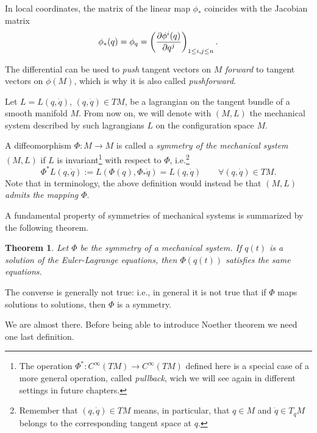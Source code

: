 \documentclass[english,fontsize=11pt,paper=a5,oneside]{scrbook}
\let\d\relax
\newcommand{\d}{\mathrm{d}}
\newtheorem{theorem}{Theorem}[chapter]
\theoremstyle{definition}
\begin{document}
In local coordinates, the matrix of the linear map $\phi_*$ coincides with the Jacobian matrix
\begin{equation}
  \phi_*(q) = \d \phi_q = \left(\frac{\partial \phi^i(q)}{\partial q^j}\right)_{1\leq i,j\leq n}.
\end{equation}

The differential can be used to \emph{push} tangent vectors on $M$ \emph{forward} to tangent vectors on $\phi(M)$, which is why it is also called \emph{pushforward}.

\begin{tcolorbox}
  Let $L = L(q, \dot q)$, $(q, \dot q)\in TM$, be a lagrangian on the tangent bundle of a smooth manifold $M$. From now on, we will denote with $(M, L)$ the mechanical system described by such lagrangians $L$ on the configuration space $M$.
\end{tcolorbox}

A diffeomorphism $\Phi: M \to M$ is called a \emph{symmetry of the mechanical system $(M,L)$} if $L$ is invariant\footnote{The operation $\Phi^*:C^\infty(TM) \to C^\infty(TM)$ defined here is a special case of a more general operation, called \emph{pullback}, wich we will see again in different settings in future chapters.} with respect to $\Phi$, i.e.\footnote{Remember that $(q,\dot q)\in TM$ means, in particular, that $q\in M$ and $\dot q \in T_q M$ belongs to the corresponding tangent space at $q$.}
\begin{equation}\label{eq:symmetry}
  \Phi^* L (q,\dot q) := L\left(\Phi(q), \Phi_*\dot q\right) = L(q,\dot q) \qquad \forall (q,\dot q) \in TM.
\end{equation}
Note that in \cite[Chapter 4]{book:arnold} terminology, the above definition would instead be that \emph{$(M,L)$ admits the mapping $\Phi$}.

A fundamental property of symmetries of mechanical systems is summarized by the following theorem.

\begin{theorem}
  Let $\Phi$ be the symmetry of a mechanical system. If $q(t)$ is a solution of the Euler-Lagrange equations, then $\Phi(q(t))$ satisfies the same equations.
\end{theorem}

The converse is generally not true: i.e., in general it is not true that if $\Phi$ maps solutions to solutions, then $\Phi$ is a symmetry.

We are almost there.
Before being able to introduce Noether theorem we need one last definition.
\end{document}
